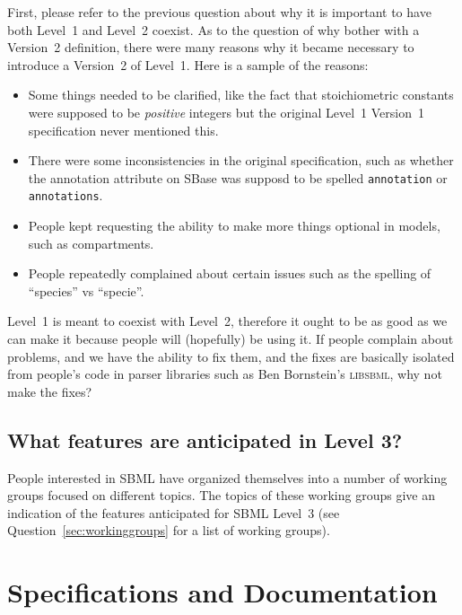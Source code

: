 \documentclass{sbmlfaq}
\begin{document}
First, please refer to the previous question about why it is important to
have both Level~1 and Level~2 coexist.  As to the question of why bother
with a Version~2 definition, there were many reasons why it became
necessary to introduce a Version~2 of Level~1.  Here is a sample of the
reasons:
\begin{itemize}
  
\item Some things needed to be clarified, like the fact that stoichiometric
  constants were supposed to be \emph{positive} integers but the original
  Level~1 Version~1 specification never mentioned this.
  
\item There were some inconsistencies in the original specification, such
  as whether the annotation attribute on SBase was supposd to be spelled
  \texttt{annotation} or \texttt{annotations}.
  
\item People kept requesting the ability to make more things optional in
  models, such as compartments.
  
\item People repeatedly complained about certain issues such as the
  spelling of ``species'' vs ``specie''.

\end{itemize}

Level~1 is meant to coexist with Level~2, therefore it ought to be as good
as we can make it because people will (hopefully) be using it.  If people
complain about problems, and we have the ability to fix them, and the fixes
are basically isolated from people's code in parser libraries such as Ben
Bornstein's \textsc{libsbml}, why not make the fixes?



\subsection{What features are anticipated in Level 3?}

People interested in SBML have organized themselves into a number of
working groups focused on different topics.  The topics of these working
groups give an indication of the features anticipated for SBML Level~3
(see Question~\ref{sec:workinggroups} for a list of working groups).


\section{Specifications and Documentation}
\label{sec:docs}
\end{document}
